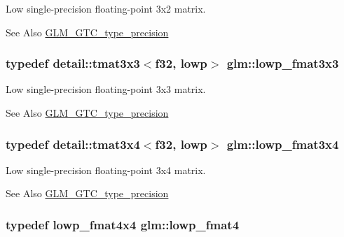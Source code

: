 Low single-\/precision floating-\/point 3x2 matrix. \begin{DoxySeeAlso}{See Also}
\hyperlink{group__gtc__type__precision}{G\-L\-M\-\_\-\-G\-T\-C\-\_\-type\-\_\-precision} 
\end{DoxySeeAlso}
\hypertarget{group__gtc__type__precision_ga25b389b52269f3256f015b4fff5789c2}{
\subsubsection[{lowp\-\_\-fmat3x3}]{\setlength{\rightskip}{0pt plus 5cm}typedef detail\-::tmat3x3$<$f32, lowp$>$ {\bf glm\-::lowp\-\_\-fmat3x3}}}\label{group__gtc__type__precision_ga25b389b52269f3256f015b4fff5789c2}
Low single-\/precision floating-\/point 3x3 matrix. \begin{DoxySeeAlso}{See Also}
\hyperlink{group__gtc__type__precision}{G\-L\-M\-\_\-\-G\-T\-C\-\_\-type\-\_\-precision} 
\end{DoxySeeAlso}
\hypertarget{group__gtc__type__precision_ga366a3249a72ddc76fb3ee4f2379cf3fb}{
\subsubsection[{lowp\-\_\-fmat3x4}]{\setlength{\rightskip}{0pt plus 5cm}typedef detail\-::tmat3x4$<$f32, lowp$>$ {\bf glm\-::lowp\-\_\-fmat3x4}}}\label{group__gtc__type__precision_ga366a3249a72ddc76fb3ee4f2379cf3fb}
Low single-\/precision floating-\/point 3x4 matrix. \begin{DoxySeeAlso}{See Also}
\hyperlink{group__gtc__type__precision}{G\-L\-M\-\_\-\-G\-T\-C\-\_\-type\-\_\-precision} 
\end{DoxySeeAlso}
\hypertarget{group__gtc__type__precision_ga00dfb85ec53bb5f173747f73d13c1b8b}{
\subsubsection[{lowp\-\_\-fmat4}]{\setlength{\rightskip}{0pt plus 5cm}typedef lowp\-\_\-fmat4x4 {\bf glm\-::lowp\-\_\-fmat4}}}\label{group__gtc__type__precision_ga00dfb85ec53bb5f173747f73d13c1b8b}
